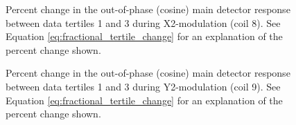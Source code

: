 \begin{figure}[h]

\centering
{}
\caption{Percent change in the out-of-phase (cosine) main detector response between data tertiles 1 and 3 during X2-modulation (coil 8). See Equation \ref{eq:fractional_tertile_change} for an explanation of the percent change shown.}
\label{fig:tert_md_coeff_coil8}
\end{figure}
\begin{figure}[h]

\centering
{}
\caption{Percent change in the out-of-phase (cosine) main detector response between data tertiles 1 and 3 during Y2-modulation (coil 9). See Equation \ref{eq:fractional_tertile_change} for an explanation of the percent change shown.}
\label{fig:tert_md_coeff_coil9}
\end{figure}
